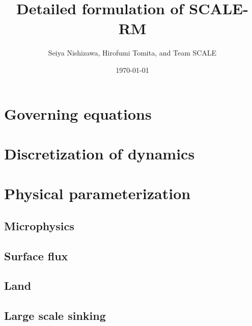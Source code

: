 \documentclass[a4paper]{report}
\title{{\LARGE Detailed formulation of SCALE-RM}}
\author{Seiya Nishizawa, Hirofumi Tomita, and Team SCALE}
\date{\today}
\begin{document}
\maketitle
\tableofcontents




\chapter{Governing equations}


\chapter{Discretization of dynamics}
\label{chap:discretization dynamics}














\chapter{Physical parameterization}



\section{Microphysics}


%



\section{Surface flux}


\section{Land}


%

\section{Large scale sinking}





\appendix





\end{document}
